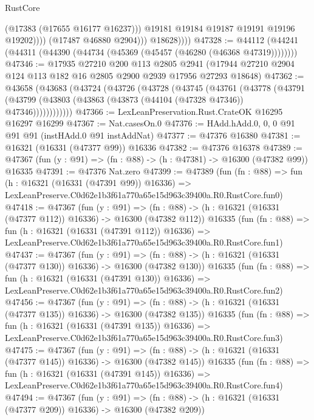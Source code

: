 \begin{lexlean}{RustCore}
\begin{coremodule}
                          (@17383 (@17655 @16177 @16237)))
                        @19181
                        @19184
                        @19187
                        @19191
                        @19196
                        @19202))))
                (@17487 @46880 @2904)))
            @18628))))
@47328 := @44112 (@44241 (@44311 (@44390 (@44734 (@45369 (@45457 (@46280 (@46368 @47319))))))))
@47346 := @17935
    @27210
    @200
    @113
    @2805
    @2941
    (@17944 @27210 @2904 @124 @113 @182 @16 @2805 @2900 @2939 @17956 @27293 @18648)
@47362 := @43658
    (@43683
      (@43724
        (@43726
          (@43728
            (@43745
              (@43761
                (@43778
                  (@43791
                    (@43799 (@43803 (@43863 (@43873 (@44104 (@47328 @47346)) @47346))))))))))))
@47366 := LexLeanPreservation.Rust.CrateOK @16295 @16297 @16299
@47367 := Nat.casesOn.{0}
@47376 := HAdd.hAdd.{0, 0, 0} @91 @91 @91 (instHAdd.{0} @91 instAddNat)
@47377 := @47376 @16380
@47381 := @16321 (@16331 (@47377 @99)) @16336
@47382 := @47376 @16378
@47389 := @47367 (fun (y : @91) => (fn : @88) -> (h : @47381) -> @16300 (@47382 @99)) @16335
@47391 := @47376 Nat.zero
@47399 := @47389
    (fun (fn : @88) =>
    fun (h : @16321 (@16331 (@47391 @99)) @16336) =>
    LexLeanPreserve.C0d62e1b3f61a770a65e15d963c39400a.R0.RustCore.fun0)
@47418 := @47367
    (fun (y : @91) =>
    (fn : @88) -> (h : @16321 (@16331 (@47377 @112)) @16336) -> @16300 (@47382 @112))
    @16335
    (fun (fn : @88) =>
    fun (h : @16321 (@16331 (@47391 @112)) @16336) =>
    LexLeanPreserve.C0d62e1b3f61a770a65e15d963c39400a.R0.RustCore.fun1)
@47437 := @47367
    (fun (y : @91) =>
    (fn : @88) -> (h : @16321 (@16331 (@47377 @130)) @16336) -> @16300 (@47382 @130))
    @16335
    (fun (fn : @88) =>
    fun (h : @16321 (@16331 (@47391 @130)) @16336) =>
    LexLeanPreserve.C0d62e1b3f61a770a65e15d963c39400a.R0.RustCore.fun2)
@47456 := @47367
    (fun (y : @91) =>
    (fn : @88) -> (h : @16321 (@16331 (@47377 @135)) @16336) -> @16300 (@47382 @135))
    @16335
    (fun (fn : @88) =>
    fun (h : @16321 (@16331 (@47391 @135)) @16336) =>
    LexLeanPreserve.C0d62e1b3f61a770a65e15d963c39400a.R0.RustCore.fun3)
@47475 := @47367
    (fun (y : @91) =>
    (fn : @88) -> (h : @16321 (@16331 (@47377 @145)) @16336) -> @16300 (@47382 @145))
    @16335
    (fun (fn : @88) =>
    fun (h : @16321 (@16331 (@47391 @145)) @16336) =>
    LexLeanPreserve.C0d62e1b3f61a770a65e15d963c39400a.R0.RustCore.fun4)
@47494 := @47367
    (fun (y : @91) =>
    (fn : @88) -> (h : @16321 (@16331 (@47377 @209)) @16336) -> @16300 (@47382 @209))

\end{coremodule}
\end{lexlean}
